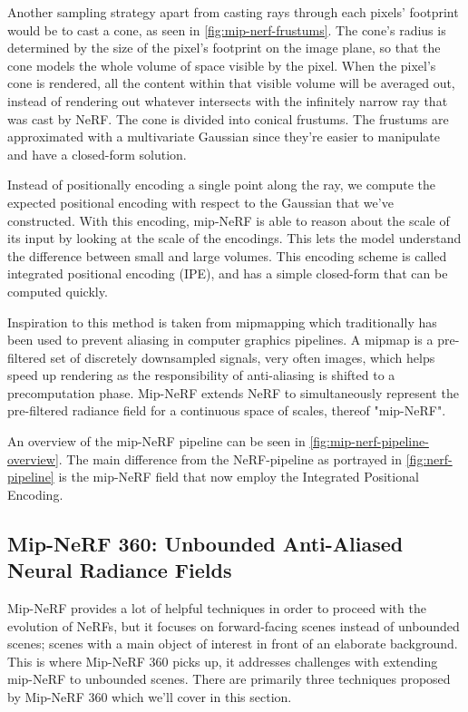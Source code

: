 Another sampling strategy apart from casting rays through each pixels' footprint would be to cast a cone, as seen in \autoref{fig:mip-nerf-frustums}. The cone's radius is determined by the size of the pixel's footprint on the image plane, so that the cone models the whole volume of space visible by the pixel. When the pixel's cone is rendered, all the content within that visible volume will be averaged out, instead of rendering out whatever intersects with the infinitely narrow ray that was cast by NeRF. The cone is divided into conical frustums. The frustums are approximated with a multivariate Gaussian since they're easier to manipulate and have a closed-form solution.



Instead of positionally encoding a single point along the ray, we compute the expected positional encoding with respect to the Gaussian that we've constructed. With this encoding, mip-NeRF is able to reason about the scale of its input by looking at the scale of the encodings. This lets the model understand the difference between small and large volumes. This encoding scheme is called integrated positional encoding (IPE), and has a simple closed-form that can be computed quickly.

Inspiration to this method is taken from mipmapping which traditionally has been used to prevent aliasing in computer graphics pipelines. A mipmap is a pre-filtered set of discretely downsampled signals, very often images, which helps speed up rendering as the responsibility of anti-aliasing is shifted to a precomputation phase. Mip-NeRF extends NeRF to simultaneously represent the pre-filtered radiance field for a continuous space of scales, thereof "mip-NeRF".

An overview of the mip-NeRF pipeline can be seen in \autoref{fig:mip-nerf-pipeline-overview}. The main difference from the NeRF-pipeline as portrayed in \autoref{fig:nerf-pipeline} is the mip-NeRF field that now employ the Integrated Positional Encoding.





\subsection{Mip-NeRF 360: Unbounded Anti-Aliased Neural Radiance Fields} \label{sec:mipnerf360}
Mip-NeRF provides a lot of helpful techniques in order to proceed with the evolution of NeRFs, but it focuses on forward-facing scenes instead of unbounded scenes; scenes with a main object of interest in front of an elaborate background. This is where Mip-NeRF 360 picks up, it addresses challenges with extending mip-NeRF to unbounded scenes. There are primarily three techniques proposed by Mip-NeRF 360 which we'll cover in this section.

